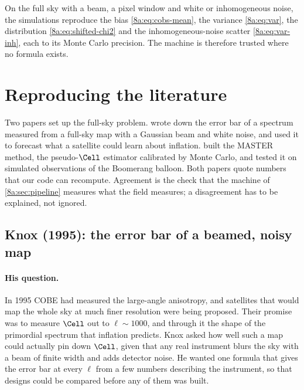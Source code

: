 \begin{keyidea}
On the full sky with a beam, a pixel window and white or inhomogeneous noise, the simulations
reproduce the bias \eqref{8a:eq:cobs-mean}, the variance \eqref{8a:eq:var}, the distribution
\eqref{8a:eq:shifted-chi2} and the inhomogeneous-noise scatter \eqref{8a:eq:var-inh}, each to its
Monte Carlo precision. The machine is therefore trusted where no formula exists.
\end{keyidea}
\section{Reproducing the literature}
\label{8a:sec:literature}

Two papers set up the full-sky problem. \textcite{Knox1995} wrote down the error bar
of a spectrum measured from a full-sky map with a Gaussian beam and white noise, and used it
to forecast what a satellite could learn about inflation. \textcite{Hivon2002} built the
MASTER method, the pseudo-$\Cell$ estimator calibrated by Monte Carlo, and tested it on
simulated observations of the Boomerang balloon. Both papers quote numbers that our code
can recompute. Agreement is the check that the machine of \cref{8a:sec:pipeline} measures
what the field measures; a disagreement has to be explained, not ignored.

\subsection{Knox (1995): the error bar of a beamed, noisy map}
\label{8a:sec:lit-knox}

\paragraph{His question.}
In 1995 COBE had measured the large-angle anisotropy, and satellites that would map the whole sky
at much finer resolution were being proposed. Their promise was to measure $\Cell$ out to
$\ell\sim1000$, and through it the shape of the primordial spectrum that inflation predicts. Knox
asked how well such a map could actually pin down $\Cell$, given that any real instrument blurs
the sky with a beam of finite width and adds detector noise. He wanted one formula that gives the
error bar at every $\ell$ from a few numbers describing the instrument, so that designs could be
compared before any of them was built.

